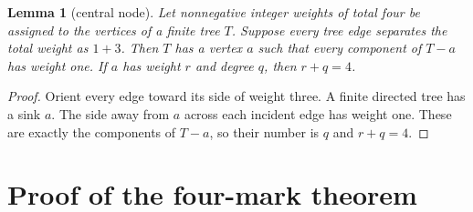 \documentclass[11pt]{article}
\newtheorem{lemma}[theorem]{Lemma}
\theoremstyle{definition}
\theoremstyle{remark}
\begin{document}
\begin{lemma}[central node]\label{lem:central}
Let nonnegative integer weights of total four be assigned to the
vertices of a finite tree \(T\).  Suppose every tree edge separates the
total weight as \(1+3\).  Then \(T\) has a vertex \(a\) such that every
component of \(T-a\) has weight one.  If \(a\) has weight \(r\) and
degree \(q\), then \(r+q=4\).
\end{lemma}

\begin{proof}
Orient every edge toward its side of weight three.  A finite directed
tree has a sink \(a\).  The side away from \(a\) across each incident
edge has weight one.  These are exactly the components of \(T-a\), so
their number is \(q\) and \(r+q=4\).
\end{proof}

\section{Proof of the four-mark theorem}
\end{document}
